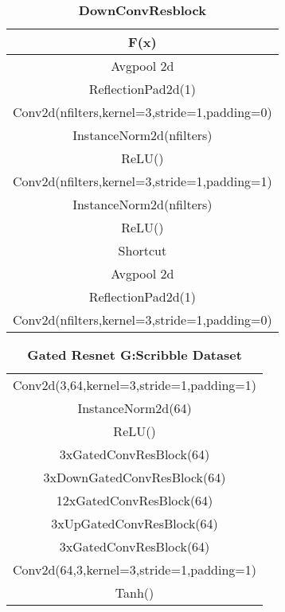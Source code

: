 \begin{table}[ht]
\caption{\textbf{DownConvResblock}} %
\centering %
\begin{tabular}{c} %
\hline\hline %
F(x)\\%
\hline
Avgpool 2d \\
ReflectionPad2d(1) \\
Conv2d(nfilters,kernel=3,stride=1,padding=0) \\
InstanceNorm2d(nfilters)\\ %
ReLU() \\
Conv2d(nfilters,kernel=3,stride=1,padding=1) \\
InstanceNorm2d(nfilters)\\ %
ReLU() \\
\hline %
Shortcut\\
\hline 
Avgpool 2d \\
ReflectionPad2d(1)\\
Conv2d(nfilters,kernel=3,stride=1,padding=0) \\
\hline
\end{tabular}
\label{table:downconvresblock} %
\end{table}


\begin{table}[ht]
\caption{\textbf{Gated Resnet G:Scribble Dataset}}
\centering %
\begin{tabular}{c} %
\hline
Conv2d(3,64,kernel=3,stride=1,padding=1) \\
InstanceNorm2d(64)\\ %
ReLU() \\
\hline %
3xGatedConvResBlock(64) \\
3xDownGatedConvResBlock(64) \\
12xGatedConvResBlock(64) \\
3xUpGatedConvResBlock(64) \\
3xGatedConvResBlock(64) \\
\hline
Conv2d(64,3,kernel=3,stride=1,padding=1) \\
Tanh() \\
\hline
\end{tabular}
\label{table:resnet_g_scribble} %
\end{table}

